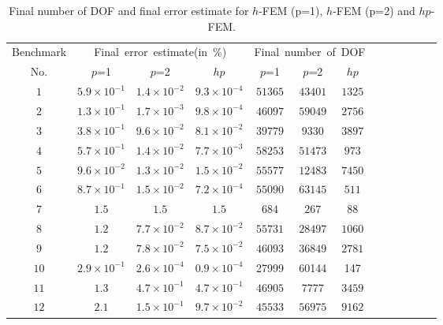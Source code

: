\documentclass[12pt]{elsarticle}
\begin{document}
\begin{table}[H]
\begin{center}
\begin{tabular}{|c|c|c|c|c|c|c|c|c|c|c|c|c|}

\hline
{ \mbox{Benchmark}}
& \multicolumn{3}{c|}{ \mbox{Final error estimate(in~\%)}}
& \multicolumn{3}{c|}{ \mbox{Final number of DOF}} \\

\cline{2-7}
No. & $p$=1 & $p$=2 & $hp$ & $p$=1 & $p$=2 & $hp$\\

\hline
$1$& $5.9\times10^{-1}$ & $1.4\times10^{-2}$ & $9.3\times10^{-4}$
& $51365$ & $43401$ & $1325$ \\

$2$& $1.3\times10^{-1}$ & $1.7\times10^{-3}$ & $9.8\times10^{-4}$
& $46097$ & $59049$ & $2756$ \\

$3$& $3.8\times10^{-1}$ & $9.6\times10^{-2}$ & $8.1\times10^{-2}$
& $39779$ & $9330$ & $3897$ \\

$4$& $5.7\times10^{-1}$ & $1.4\times10^{-2}$ & $7.7\times10^{-3}$
& $58253$ & $51473$ & $973$ \\

$5$& $9.6\times10^{-2}$ & $1.3\times10^{-2}$ & $1.5\times10^{-2}$
& $55577$ & $12483$ & $7450$ \\

$6$& $8.7\times10^{-1}$ & $1.5\times10^{-2}$ & $7.2\times10^{-4}$
& $55090$ & $63145$ & $511$ \\

$7$& $1.5$ & $1.5$ & $1.5$
& $684$ & $267$ & $88$ \\

$8$& $1.2$ & $7.7\times10^{-2}$ & $8.7\times10^{-2}$
& $55731$ & $28497$ & $1060$ \\

$9$& $1.2$ & $7.8\times10^{-2}$ & $7.5\times10^{-2}$
& $46093$ & $36849$ & $2781$ \\

$10$& $2.9\times10^{-1}$ & $2.6\times10^{-4}$ & $0.9\times10^{-4}$
& 27999 & 60144 & 147 \\

$11$& $1.3$ & $4.7\times10^{-1}$ & $4.7\times10^{-1}$
& $46905$ & $7777$ & $3459$ \\

$12$& $2.1$ & $1.5\times10^{-1}$ & $9.7\times10^{-2}$
& $45533$ & $56975$ & $9162$ \\

\hline
\end{tabular}
\end{center}
\caption{Final number of DOF and final error estimate
for $h$-FEM (p=1), $h$-FEM (p=2) and $hp$-FEM.}
\end{table}
\end{document}
